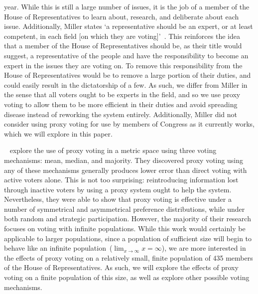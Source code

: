 year.
While this is still a large number of issues, it is the job of a member of the House
of Representatives to learn about, research, and deliberate about each issue.
Additionally, Miller states `a representative should be an expert, or at least
competent, in each field [on which they are voting]'~\cite{Miller1969}.
This reinforces the idea that a member of the House of Representatives should be, as
their title would suggest, a representative of the people and have the responsibility
to become an expert in the issues they are voting on.
To remove this responsibility from the House of Representatives would be to remove
a large portion of their duties, and could easily result in the dictatorship of a few.
As such, we differ from Miller in the sense that all voters ought to be experts in
the field, and so we use proxy voting to allow them to be more efficient in their
duties and avoid spreading disease instead of reworking the system entirely.
Additionally, Miller did not consider using proxy voting for use by members of
Congress as it currently works, which we will explore in this paper.

~\cite{Cohensius2017} explore the use of proxy voting in a metric space
using three voting mechanisms: mean, median, and majority.
They discovered proxy voting using any of these mechanisms generally produces lower
error than direct voting with active voters alone.
This is not too surprising: reintroducing information lost through inactive voters by
using a proxy system ought to help the system.
Nevertheless, they were able to show that proxy voting is effective under a number of
symmetrical and asymmetrical preference distributions, while under both random and
strategic participation.
However, the majority of their research focuses on voting with infinite populations.
While this work would certainly be applicable to larger populations, since a
population of sufficient size will begin to behave like an infinite
population~($\lim_{x \rightarrow \infty} x = \infty$), we are more interested in the
effects of proxy voting on a relatively small, finite population of 435 members of the
House of Representatives.
As such, we will explore the effects of proxy voting on a finite population of this
size, as well as explore other possible voting mechanisms.

